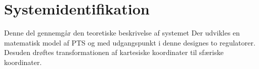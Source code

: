 \part{Systemidentifikation}
Denne del gennemgår den teoretiske beskrivelse af systemet
Der udvikles en matematisk model af PTS
og med udgangspunkt i denne designes to regulatorer.
Desuden drøftes transformationen af kartesiske koordinater til sfæriske koordinater.



%
